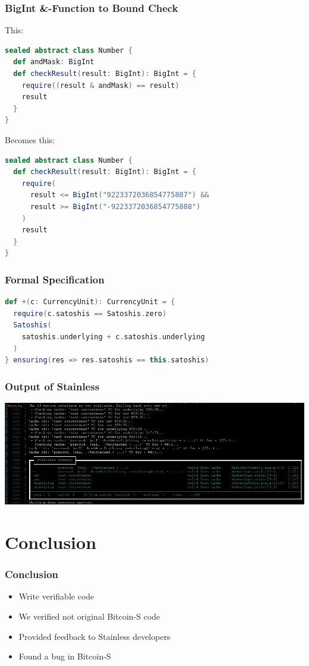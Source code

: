 \documentclass{beamer}
\begin{document}
\begin{frame}[fragile]
\frametitle{BigInt \&-Function to Bound Check}
This:
\begin{lstlisting}[language=Scala]
sealed abstract class Number {
  def andMask: BigInt
  def checkResult(result: BigInt): BigInt = {
    require((result & andMask) == result)
    result
  }
}  
\end{lstlisting}
Becomes this:
\begin{lstlisting}[language=Scala]
sealed abstract class Number {
  def checkResult(result: BigInt): BigInt = {
    require(
      result <= BigInt("9223372036854775807") &&
      result >= BigInt("-9223372036854775808")
    )
    result
  }
}
\end{lstlisting}
\end{frame}


\begin{frame}[fragile]
\frametitle{Formal Specification}
\begin{lstlisting}[language=Scala]
def +(c: CurrencyUnit): CurrencyUnit = {
  require(c.satoshis == Satoshis.zero)
  Satoshis(
    satoshis.underlying + c.satoshis.underlying
  )
} ensuring(res => res.satoshis == this.satoshis)
\end{lstlisting}
\end{frame}


\begin{frame}
\frametitle{Output of Stainless}
\centering
\includegraphics[width=\textwidth,height=0.8\textheight,keepaspectratio]{assets/final_verify_output.png}
\end{frame}


\section{Conclusion}

\begin{frame}
\frametitle{Conclusion}
\begin{itemize}
  \item Write verifiable code
  \item We verified not original Bitcoin-S code
  \item Provided feedback to Stainless developers
  \item Found a bug in Bitcoin-S
\end{itemize}
\end{frame}
\end{document}
